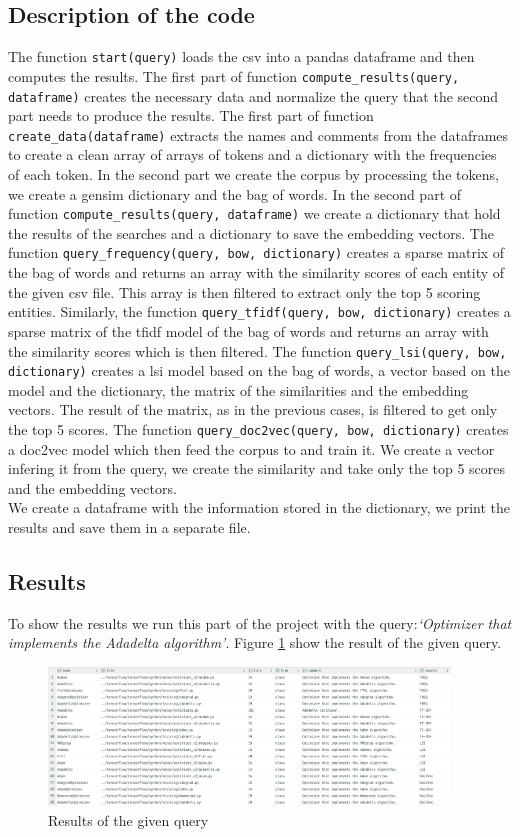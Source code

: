 \documentclass [14 pt]{article}
\begin{document}
\subsection{Description of the code} %
The function \texttt{start(query)} loads the csv into a pandas dataframe and then computes the results.
The first part of function \texttt{compute\_results(query, dataframe)} creates the necessary data and normalize the query that the second part needs to produce the results.
The first part of function \texttt{create\_data(dataframe)} extracts the names and comments from the dataframes to create a clean array of arrays of tokens and a dictionary with the frequencies of each token. In the second part we create the corpus by processing the tokens, we create a gensim dictionary and the bag of words. 
In the second part of function \texttt{compute\_results(query, dataframe)} we create a dictionary that hold the results of the searches and a dictionary to save the embedding vectors. 
The function \texttt{query\_frequency(query, bow, dictionary)} creates a sparse matrix of the bag of words and returns an array with the similarity scores of each entity of the given csv file. This array is then filtered to extract only the top 5 scoring entities.
Similarly, the function \texttt{query\_tfidf(query, bow, dictionary)} creates a sparse matrix of the tfidf model of the bag of words and returns an array with the similarity scores which is then filtered.
The function \texttt{query\_lsi(query, bow, dictionary)} creates a lsi model based on the bag of words, a vector based on the model and the dictionary, the matrix of the similarities and the embedding vectors. The result of the matrix, as in the previous cases, is filtered to get only the top 5 scores.
The function \texttt{query\_doc2vec(query, bow, dictionary)} creates a doc2vec model which then feed the corpus to and train it. We create a vector infering it from the query, we create the similarity and take only the top 5 scores and the embedding vectors.\\
We create a dataframe with the information stored in the dictionary, we print the results and save them in a separate file.

\subsection{Results} %
To show the results we run this part of the project with the query:\emph{`Optimizer that implements the Adadelta algorithm'}.
Figure \ref{fig:Part2} show the result of the given query.
\begin{figure}[h]
\centering
\includegraphics[width=0.95\textwidth]{../res/part2.png}
\caption{Results of the given query}\label{fig:Part2}
\end{figure}
\end{document}
